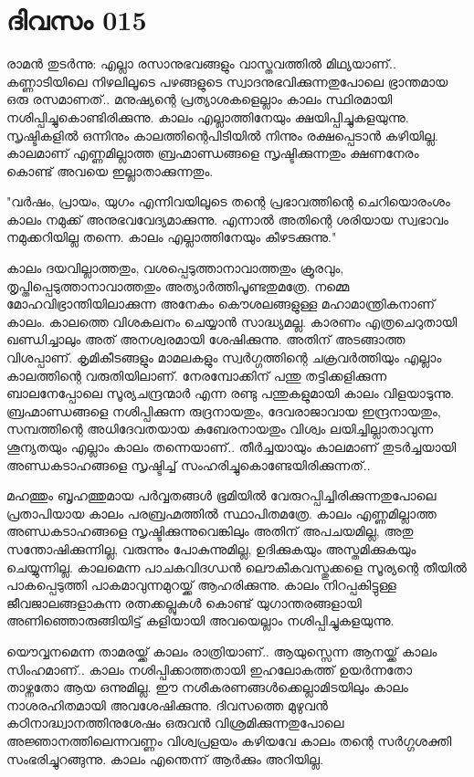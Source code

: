  
\section{ദിവസം 015}


രാമന്‍ തുടര്‍ന്നു: എല്ലാ രസാനുഭവങ്ങളും വാസ്തവത്തില്‍ മിഥ്യയാണ്‌..  കണ്ണാടിയിലെ നിഴലിലൂടെ പഴങ്ങളുടെ സ്വാദനുഭവിക്കുന്നതുപോലെ ഭ്രാന്തമായ ഒരു രസമാണത്‌..  മനുഷ്യന്റെ പ്രത്യാശകളെല്ലാം കാലം സ്ഥിരമായി നശിപ്പിച്ചുകൊണ്ടിരിക്കുന്നു. കാലം എല്ലാത്തിനേയും ക്ഷയിപ്പിച്ചുകളയുന്നു. സൃഷ്ടികളില്‍ ഒന്നിനും കാലത്തിന്റെപിടിയില്‍ നിന്നും രക്ഷപ്പെടാന്‍ കഴിയില്ല. കാലമാണ്‌ എണ്ണമില്ലാത്ത ബ്രഹ്മാണ്ഡങ്ങളെ സൃഷ്ടിക്കുന്നതും ക്ഷണനേരം കൊണ്ട്‌ അവയെ ഇല്ലാതാക്കുന്നതും. 

"വര്‍ഷം, പ്രായം, യുഗം എന്നിവയിലൂടെ തന്റെ പ്രഭാവത്തിന്റെ ചെറിയൊരംശം കാലം നമുക്ക്‌ അനുഭവവേദ്യമാക്കുന്നു. എന്നാല്‍ അതിന്റെ ശരിയായ സ്വഭാവം നമുക്കറിയില്ല തന്നെ. കാലം എല്ലാത്തിനേയും കീഴടക്കുന്നു."

കാലം ദയവില്ലാത്തതും, വശപ്പെടുത്താനാവാത്തതും ക്രൂരവും, തൃപ്തിപ്പെടുത്താനാവാത്തതും അത്യാര്‍ത്തിപൂണ്ടതുമത്രേ. നമ്മെ മോഹവിഭ്രാന്തിയിലാക്കുന്ന അനേകം കൌശലങ്ങളുള്ള മഹാമാന്ത്രികനാണ്‌ കാലം. കാലത്തെ വിശകലനം ചെയ്യാന്‍ സാദ്ധ്യമല്ല. കാരണം എത്രചെറുതായി ഖണ്ഡിച്ചാലും അത്‌ അനശ്വരമായി ശേഷിക്കുന്നു. അതിന്‌ അടങ്ങാത്ത വിശപ്പാണ്‌. കൃമികീടങ്ങളും മാമലകളും സ്വര്‍ഗ്ഗത്തിന്റെ ചക്രവര്‍ത്തിയും എല്ലാം കാലത്തിന്റെ വരുതിയിലാണ്‌. നേരമ്പോക്കിന്‌ പന്തു തട്ടിക്കളിക്കുന്ന ബാലനേപ്പോലെ സൂര്യചന്ദ്രന്മാര്‍ എന്ന രണ്ടു പന്തുകളുമായി കാലം വിളയാടുന്നു. ബ്രഹ്മാണ്ഡങ്ങളെ നശിപ്പിക്കുന്ന രുദ്രനായതും, ദേവരാജാവായ ഇന്ദ്രനായതും, സമ്പത്തിന്റെ അധിദേവതയായ കുബേരനായതും വിശ്വം ലയിച്ചില്ലാതാവുന്ന ശൂന്യതയും എല്ലാം കാലം തന്നെയാണ്‌..  തീര്‍ച്ചയായും കാലമാണ്‌ തുടര്‍ച്ചയായി അണ്ഡകടാഹങ്ങളെ സൃഷ്ടിച്ച്‌ സംഹരിച്ചുകൊണ്ടേയിരിക്കുന്നത്‌..

മഹത്തും ബൃഹത്തുമായ പര്‍വ്വതങ്ങള്‍ ഭൂമിയില്‍ വേരുറപ്പിച്ചിരിക്കുന്നതുപോലെ പ്രതാപിയായ കാലം പരബ്രഹ്മത്തില്‍ സ്ഥാപിതമത്രേ. കാലം എണ്ണമില്ലാത്ത അണ്ഡകടാഹങ്ങളെ സൃഷ്ടിക്കുന്നുവെങ്കിലും അതിന്‌ അപചയമില്ല, അതു സന്തോഷിക്കുന്നില്ല, വരുന്നും പോകുന്നുമില്ല, ഉദിക്കുകയും അസ്തമിക്കുകയും ചെയ്യുന്നില്ല. കാലമെന്ന പാചകവിദഗ്ധന്‍ ലൌകീകവസ്തുക്കളെ സൂര്യന്റെ തീയില്‍ പാകപ്പെടുത്തി പാകമാവുന്നമുറയ്ക്ക്‌ ആഹരിക്കുന്നു. കാലം നിറപ്പകിട്ടുള്ള ജീവജാലങ്ങളാകുന്ന രത്നക്കല്ലുകള്‍ കൊണ്ട്‌ യുഗാന്തരങ്ങളായി അണിഞ്ഞൊരുങ്ങിയിട്ട്‌ കളിയായി അവയെല്ലാം നശിപ്പിച്ചുകളയുന്നു.

യൌവ്വനമെന്ന താമരയ്ക്ക്‌ കാലം രാത്രിയാണ്‌..  ആയുസ്സെന്ന ആനയ്ക്ക്‌ കാലം സിംഹമാണ്‌.. കാലം നശിപ്പിക്കാത്തതായി ഇഹലോകത്ത്‌ ഉയര്‍ന്നതോ താഴ്ന്നതോ ആയ ഒന്നുമില്ല. ഈ നശീകരണങ്ങള്‍ക്കെല്ലാമിടയിലും കാലം നാശരഹിതമായി അവശേഷിക്കുന്നു. ദിവസത്തെ മുഴുവന്‍ കഠിനാദ്ധ്വാനത്തിനുശേഷം ഒരുവന്‍ വിശ്രമിക്കുന്നതുപോലെ അജ്ഞാനത്തിലെന്നവണ്ണം വിശ്വപ്രളയം കഴിയവേ കാലം തന്റെ സര്‍ഗ്ഗശക്തി സംഭരിച്ചുറങ്ങുന്നു. കാലം എന്തെന്ന് ആര്‍ക്കും അറിയില്ല.
